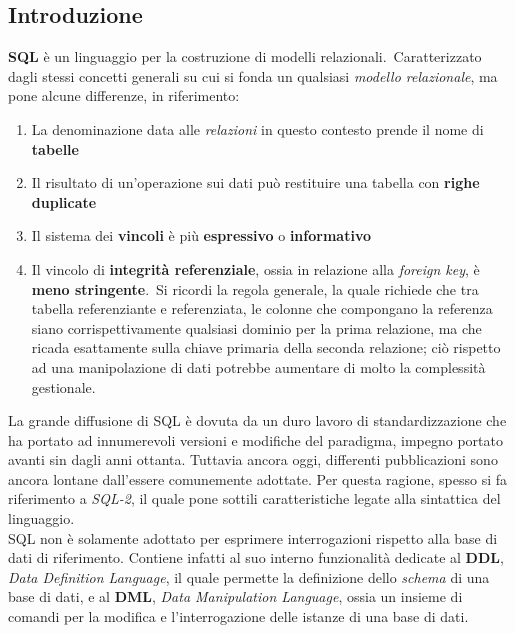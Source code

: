\documentclass{article}
\begin{document}
\subsection*{Introduzione}
\large
\textbf{SQL} è un linguaggio per la costruzione di modelli relazionali.\ Caratterizzato dagli stessi concetti generali su cui si fonda un qualsiasi \textit{modello relazionale}, ma pone alcune differenze, in riferimento:
\begin{enumerate}
    \renewcommand{\labelenumi}{-} 
    \itemsep0em
    \item La denominazione data alle \textit{relazioni} in questo contesto prende il nome di \textbf{tabelle}
    \item Il risultato di un'operazione sui dati può restituire una tabella con \textbf{righe duplicate}
    \item Il sistema dei \textbf{vincoli} è più \textbf{espressivo} o \textbf{informativo}
    \item Il vincolo di \textbf{integrità referenziale}, ossia in relazione alla \textit{foreign key}, è \textbf{meno stringente}.\ Si ricordi la regola generale, la quale richiede che tra tabella referenziante e referenziata, le colonne che compongano la referenza siano corrispettivamente qualsiasi dominio per la prima relazione, ma che ricada esattamente sulla chiave primaria della seconda relazione; ciò rispetto ad una manipolazione di dati potrebbe aumentare di molto la complessità gestionale.
\end{enumerate}
La grande diffusione di SQL è dovuta da un duro lavoro di standardizzazione che ha portato ad innumerevoli versioni e modifiche del paradigma, impegno portato avanti sin dagli anni ottanta. Tuttavia ancora oggi, differenti pubblicazioni sono ancora lontane dall'essere comunemente adottate. Per questa ragione, spesso si fa riferimento a \textit{SQL-2}, il quale pone sottili caratteristiche legate alla sintattica del linguaggio.\vspace{14pt}\\
SQL non è solamente adottato per esprimere interrogazioni rispetto alla base di dati di riferimento. Contiene infatti al suo interno funzionalità dedicate al \textbf{DDL}, \textit{Data Definition Language}, il quale permette la definizione dello \textit{schema} di una base di dati, e al \textbf{DML}, \textit{Data Manipulation Language}, ossia un insieme di comandi per la modifica e l'interrogazione delle istanze di una base di dati.
\end{document}
